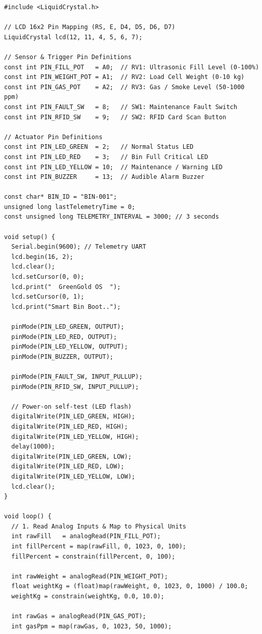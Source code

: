 \documentclass[12pt,a4paper]{article}
\begin{document}
\begin{lstlisting}[style=arduino, caption={GreenGold OS Smart Bin Simulation Firmware Source Code}, label={lst:firmware}]
#include <LiquidCrystal.h>

// LCD 16x2 Pin Mapping (RS, E, D4, D5, D6, D7)
LiquidCrystal lcd(12, 11, 4, 5, 6, 7);

// Sensor & Trigger Pin Definitions
const int PIN_FILL_POT   = A0;  // RV1: Ultrasonic Fill Level (0-100%)
const int PIN_WEIGHT_POT = A1;  // RV2: Load Cell Weight (0-10 kg)
const int PIN_GAS_POT    = A2;  // RV3: Gas / Smoke Level (50-1000 ppm)
const int PIN_FAULT_SW   = 8;   // SW1: Maintenance Fault Switch
const int PIN_RFID_SW    = 9;   // SW2: RFID Card Scan Button

// Actuator Pin Definitions
const int PIN_LED_GREEN  = 2;   // Normal Status LED
const int PIN_LED_RED    = 3;   // Bin Full Critical LED
const int PIN_LED_YELLOW = 10;  // Maintenance / Warning LED
const int PIN_BUZZER     = 13;  // Audible Alarm Buzzer

const char* BIN_ID = "BIN-001";
unsigned long lastTelemetryTime = 0;
const unsigned long TELEMETRY_INTERVAL = 3000; // 3 seconds

void setup() {
  Serial.begin(9600); // Telemetry UART
  lcd.begin(16, 2);
  lcd.clear();
  lcd.setCursor(0, 0);
  lcd.print("  GreenGold OS  ");
  lcd.setCursor(0, 1);
  lcd.print("Smart Bin Boot..");
  
  pinMode(PIN_LED_GREEN, OUTPUT);
  pinMode(PIN_LED_RED, OUTPUT);
  pinMode(PIN_LED_YELLOW, OUTPUT);
  pinMode(PIN_BUZZER, OUTPUT);

  pinMode(PIN_FAULT_SW, INPUT_PULLUP);
  pinMode(PIN_RFID_SW, INPUT_PULLUP);

  // Power-on self-test (LED flash)
  digitalWrite(PIN_LED_GREEN, HIGH);
  digitalWrite(PIN_LED_RED, HIGH);
  digitalWrite(PIN_LED_YELLOW, HIGH);
  delay(1000);
  digitalWrite(PIN_LED_GREEN, LOW);
  digitalWrite(PIN_LED_RED, LOW);
  digitalWrite(PIN_LED_YELLOW, LOW);
  lcd.clear();
}

void loop() {
  // 1. Read Analog Inputs & Map to Physical Units
  int rawFill   = analogRead(PIN_FILL_POT);
  int fillPercent = map(rawFill, 0, 1023, 0, 100);
  fillPercent = constrain(fillPercent, 0, 100);

  int rawWeight = analogRead(PIN_WEIGHT_POT);
  float weightKg = (float)map(rawWeight, 0, 1023, 0, 1000) / 100.0;
  weightKg = constrain(weightKg, 0.0, 10.0);

  int rawGas = analogRead(PIN_GAS_POT);
  int gasPpm = map(rawGas, 0, 1023, 50, 1000);


\end{lstlisting}
\end{document}
